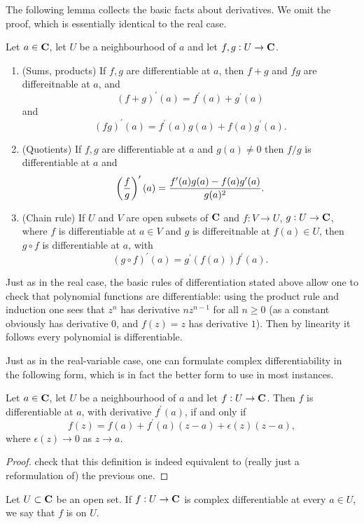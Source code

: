 The following lemma collects the basic facts about derivatives. We omit the proof, which is essentially identical to the real case.

\begin{lemma}
Let $a\in\mathbf C$, let $U$ be a neighbourhood of $a$ and let $f,g:U\to\mathbf C$.
\begin{enumerate}[label=(\roman*)]
\item (Sums, products) If $f,g$ are differentiable at $a$, then $f+g$ and $fg$ are differeitnable at $a$, and
\[(f+g)^\prime(a)=f^\prime(a)+g^\prime(a)\]
and
\[(fg)^\prime(a)=f^\prime(a)g(a)+f(a)g^\prime(a).\]
\item (Quotients) If $f,g$ are differentiable at $a$ and $g(a)\neq0$ then $f/g$ is differentiable at $a$ and
\[\left(\frac{f}{g}\right)^\prime(a)=\frac{f^\prime(a)g(a)-f(a)g^\prime(a)}{g(a)^2}.\]
\item (Chain rule) If $U$ and $V$ are open subsets of $\mathbf C$ and $f:V\to U$, $g:U\to\mathbf C$, where $f$ is differentiable at $a\in V$ and $g$ is differeitnable at $f(a)\in U$, then $g\circ f$ is differentiable at $a$, with
\[(g\circ f)^\prime(a)=g^\prime(f(a))f^\prime(a).\]
\end{enumerate}
\end{lemma}

Just as in the real case, the basic rules of differentiation stated above allow one to check that polynomial functions are differentiable: using the product rule and induction one sees that $z^n$ has derivative $nz^{n-1}$ for all $n\ge0$ (as a constant obviously has derivative $0$, and $f(z)=z$ has derivative $1$). Then by linearity it follows every polynomial is differentiable.

Just as in the real-variable case, one can formulate complex differentiability in the following form, which is in fact the better form to use in most instances.

\begin{lemma}
Let $a\in\mathbf C$, let $U$ be a neighbourhood of $a$ and let $f:U\to\mathbf C$. Then $f$ is differentiable at $a$, with derivative $f^\prime(a)$, if and only if
\[f(z)=f(a)+f^\prime(a)(z-a)+\epsilon(z)(z-a),\]
where $\epsilon(z)\to0$ as $z\to a$.
\end{lemma}

\begin{proof}
check that this definition is indeed equivalent to (really just a reformulation of) the previous one.
\end{proof}

\begin{definition}
Let $U\subset\mathbf C$ be an open set. If $f:U\to\mathbf C$ is complex differentiable at every $a\in U$, we say that $f$ is  on $U$.
\end{definition}

